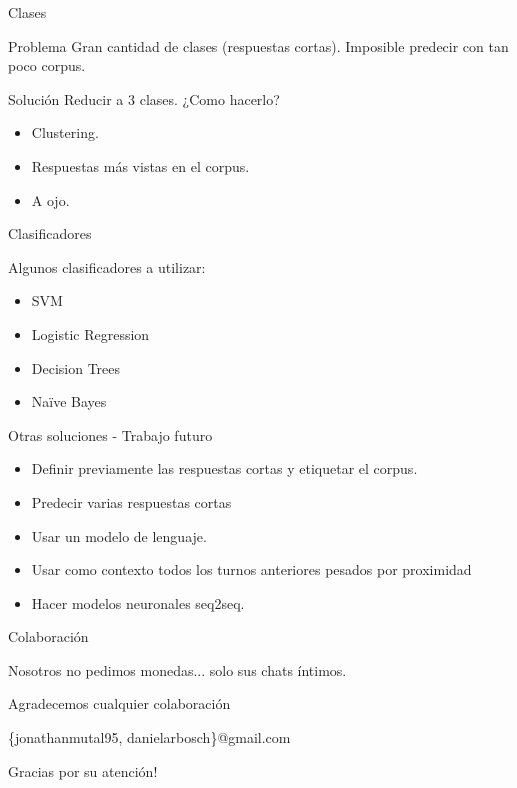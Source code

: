 \documentclass{beamer}
\begin{document}
\begin{frame}{Clases}
	\begin{block}{Problema}
     	Gran cantidad de clases (respuestas cortas). Imposible predecir con tan poco corpus.
    \end{block}
    \begin{block}{Solución}
   		Reducir a 3 clases. ¿Como hacerlo?
        \begin{itemize}
			\item Clustering.
            \item Respuestas más vistas en el corpus.
            \item A ojo.
		\end{itemize}
    \end{block}
\end{frame}

\begin{frame}{Clasificadores}
	\begin{block}{}
    	Algunos clasificadores a utilizar:
		\begin{itemize}
			\item SVM
            \item Logistic Regression
            \item Decision Trees
            \item Naïve Bayes
		\end{itemize}
	\end{block}
\end{frame}

\begin{frame}{Otras soluciones - Trabajo futuro}
  \begin{itemize}
    \item Definir previamente las respuestas cortas y etiquetar el corpus.
    \item Predecir varias respuestas cortas
    \item Usar un modelo de lenguaje.
    \item Usar como contexto todos los turnos anteriores pesados por proximidad 
    \item Hacer modelos neuronales seq2seq.
  \end{itemize}
\end{frame}

\begin{frame}{Colaboración}
	\begin{block}{}
		\begin{center}
       		Nosotros no pedimos monedas... solo sus chats íntimos. \\
        \end{center}
        \begin{center}
        	Agradecemos cualquier colaboración
        \end{center}
        \begin{center}
        	\{jonathanmutal95, danielarbosch\}@gmail.com \\        
        \end{center}
    \end{block}
    \begin{center}	
		Gracias por su atención!
    \end{center}
\end{frame}
\end{document}
